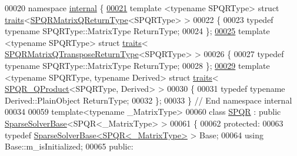 \begin{DoxyCode}
00020   \textcolor{keyword}{namespace }\hyperlink{namespaceinternal}{internal} \{
\hyperlink{struct_eigen_1_1internal_1_1traits_3_01_s_p_q_r_matrix_q_return_type_3_01_s_p_q_r_type_01_4_01_4}{00021}     \textcolor{keyword}{template} <\textcolor{keyword}{typename} SPQRType> \textcolor{keyword}{struct }\hyperlink{struct_eigen_1_1internal_1_1traits}{traits}<\hyperlink{struct_eigen_1_1_s_p_q_r_matrix_q_return_type}{SPQRMatrixQReturnType}<SPQRType> >
00022     \{
00023       \textcolor{keyword}{typedef} \textcolor{keyword}{typename} SPQRType::MatrixType ReturnType;
00024     \};
\hyperlink{struct_eigen_1_1internal_1_1traits_3_01_s_p_q_r_matrix_q_transpose_return_type_3_01_s_p_q_r_type_01_4_01_4}{00025}     \textcolor{keyword}{template} <\textcolor{keyword}{typename} SPQRType> \textcolor{keyword}{struct }\hyperlink{struct_eigen_1_1internal_1_1traits}{traits}<
      \hyperlink{struct_eigen_1_1_s_p_q_r_matrix_q_transpose_return_type}{SPQRMatrixQTransposeReturnType}<SPQRType> >
00026     \{
00027       \textcolor{keyword}{typedef} \textcolor{keyword}{typename} SPQRType::MatrixType ReturnType;
00028     \};
\hyperlink{struct_eigen_1_1internal_1_1traits_3_01_s_p_q_r___q_product_3_01_s_p_q_r_type_00_01_derived_01_4_01_4}{00029}     \textcolor{keyword}{template} <\textcolor{keyword}{typename} SPQRType, \textcolor{keyword}{typename} Derived> \textcolor{keyword}{struct }\hyperlink{struct_eigen_1_1internal_1_1traits}{traits}<
      \hyperlink{struct_eigen_1_1_s_p_q_r___q_product}{SPQR\_QProduct}<SPQRType, Derived> >
00030     \{
00031       \textcolor{keyword}{typedef} \textcolor{keyword}{typename} Derived::PlainObject ReturnType;
00032     \};
00033   \} \textcolor{comment}{// End namespace internal}
00034   
00059 \textcolor{keyword}{template}<\textcolor{keyword}{typename} \_MatrixType>
00060 \textcolor{keyword}{class }\hyperlink{class_eigen_1_1_s_p_q_r}{SPQR} : \textcolor{keyword}{public} \hyperlink{group___sparse_core___module_class_eigen_1_1_sparse_solver_base}{SparseSolverBase}<SPQR<\_MatrixType> >
00061 \{
00062   \textcolor{keyword}{protected}:
00063     \textcolor{keyword}{typedef} \hyperlink{group___sparse_core___module_class_eigen_1_1_sparse_solver_base}{SparseSolverBase<SPQR<\_MatrixType>} > Base;
00064     \textcolor{keyword}{using} Base::m\_isInitialized;
00065   \textcolor{keyword}{public}:

\end{DoxyCode}
